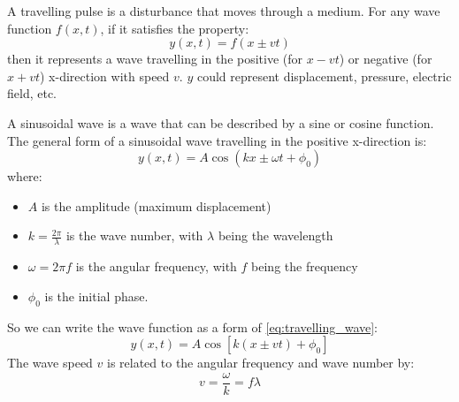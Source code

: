 \documentclass[11pt]{report}
\begin{document}
\begin{definition}
    A travelling pulse is a disturbance that moves through a medium. For any wave function $f(x,t)$, if it satisfies the property:
    \begin{equation} \label{eq:travelling_wave}
        y(x,t) = f(x \pm vt)
    \end{equation}
    then it represents a wave travelling in the positive (for $x - vt$) or negative (for $x + vt$) x-direction with speed \( v \). $y$ could represent displacement, pressure, electric field, etc.
\end{definition}

\begin{definition}
    A sinusoidal wave is a wave that can be described by a sine or cosine function. The general form of a sinusoidal wave travelling in the positive x-direction is:
    $$
        y(x,t) = A \cos(kx \pm \omega t + \phi_0)
    $$
    where:
    \begin{itemize}
        \item \( A \) is the amplitude (maximum displacement)
        \item \( k = \frac{2\pi}{\lambda} \) is the wave number, with \( \lambda \) being the wavelength
        \item \( \omega = 2\pi f \) is the angular frequency, with \( f \) being the frequency
        \item \( \phi _0 \) is the initial phase.
    \end{itemize}
    So we can write the wave function as a form of \eqref{eq:travelling_wave}:
    $$
        y(x,t) = A \cos\left[k(x \pm vt) + \phi_0\right]
    $$
    The wave speed \( v \) is related to the angular frequency and wave number by:
    \begin{equation}\label{eq:wave_speed}
        v = \frac{\omega}{k} = f\lambda
    \end{equation}
\end{definition}
\end{document}
